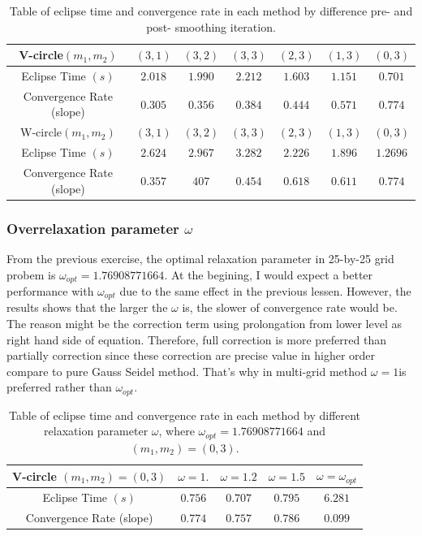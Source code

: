 \documentclass[12pt]{article}
\begin{document}
\begin{table}[b!]
	\begin{center}
		\begin{tabular}{c|c|c|c|c|c|c}
			\hline
			V-circle$(m_1,m_2)$ & $(3,1)$& $(3,2)$& $(3,3)$ & $(2,3)$ & $(1,3)$&$(0,3)$ \\ 
			\hline
			Eclipse Time $(s)$ & $ 2.018$&$1.990$&$2.212$ &$1.603$&$1.151$&$0.701$ \\
			\hline
			Convergence Rate (slope) & $0.305$& $0.356$& $0.384$& $0.444$& $0.571$&$0.774$\\
			\hline
			\hline
			W-circle$(m_1,m_2)$ & $(3,1)$& $(3,2)$& $(3,3)$ & $(2,3)$ & $(1,3)$&$(0,3)$ \\ 
			\hline
			Eclipse Time $(s)$ & $ 2.624$&$2.967$&$3.282$ &$2.226$&$1.896$&$1.2696$ \\
			\hline
			Convergence Rate (slope) & $0.357$& $407$& $0.454$& $0.618$& $0.611$&$0.774$\\
			\hline
		\end{tabular}
	\end{center}
	\caption{Table of eclipse time and convergence rate in each method by difference pre- and post- smoothing iteration.}
\end{table}

\subsubsection{Overrelaxation parameter $\omega$}
From the previous exercise, the optimal relaxation parameter in 25-by-25 grid probem is $\omega_{opt}=1.76908771664$. At the begining, I would expect a better performance with $\omega_{opt}$ due to the same effect in the previous lessen. However, the results shows that the larger the $\omega$ is, the slower of convergence rate would be. The reason might be the correction term using prolongation from lower level as right hand side of equation. Therefore, full correction is more preferred than partially correction since these correction are precise value in higher order compare to pure Gauss Seidel method. That's why in multi-grid method $\omega=1$is preferred rather than $\omega_{opt}$.

\begin{table}[b!]
	\begin{center}
		\begin{tabular}{c|c|c|c|c}
			\hline
			V-circle  $(m_1,m_2)=(0,3)$& $\omega=1.$&$\omega=1.2$& $\omega=1.5$ & $\omega=\omega_{opt}$ \\ 
			\hline
			Eclipse Time $(s)$ & $ 0.756$&$0.707$&$0.795$ &$6.281$\\
			\hline
			Convergence Rate (slope) & $0.774$& $0.757$& $0.786$& $0.099$\\
			\hline
		\end{tabular}
	\end{center}
	\caption{Table of eclipse time and convergence rate in each method by different relaxation parameter $\omega$, where $\omega_{opt}=1.76908771664$ and $(m_1,m_2)=(0,3)$.}
\end{table}
\end{document}
